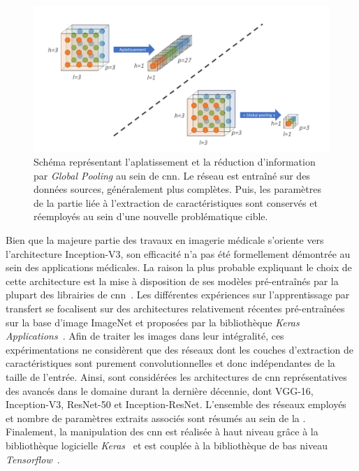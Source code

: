 \begin{figure}[H]
    \centering
    \includegraphics[width=\linewidth]{contents/chapter_4/resources/scheme_global_pooling.pdf}
    \caption{Schéma représentant l'aplatissement et la réduction d'information par \textit{Global Pooling} au sein de \gls{cnn}. Le réseau est entraîné sur des données sources, généralement plus complètes. Puis, les paramètres de la partie liée à l'extraction de caractéristiques sont conservés et réemployés au sein d'une nouvelle problématique cible.}
    \label{fig:scheme_global_pooling}
\end{figure}\par

Bien que la majeure partie des travaux en imagerie médicale s'oriente vers l'architecture Inception-V3, son efficacité n'a pas été formellement démontrée au sein des applications médicales. La raison la plus probable expliquant le choix de cette architecture est la mise à disposition de ses modèles pré-entraînés par la plupart des librairies de \gls{cnn}~\cite{Litjens2017}. Les différentes expériences sur l'apprentissage par transfert se focalisent sur des architectures relativement récentes pré-entraînées sur la base d'image ImageNet et proposées par la bibliothèque \textit{Keras Applications}~\cite{chollet2015a}. Afin de traiter les images dans leur intégralité, ces expérimentations ne considèrent que des réseaux dont les couches d'extraction de caractéristiques sont purement convolutionnelles et donc indépendantes de la taille de l'entrée. Ainsi, sont considérées les architectures de \gls{cnn} représentatives des avancés dans le domaine durant la dernière décennie, dont VGG-16, Inception-V3, ResNet-50 et Inception-ResNet. L'ensemble des réseaux employés et nombre de paramètres extraits associés sont résumés au sein de la . Finalement, la manipulation des \ac{cnn} est réalisée à haut niveau grâce à la bibliothèque logicielle \textit{Keras}~\cite{chollet2015} et est couplée à la bibliothèque de bas niveau \textit{Tensorflow}~\cite{tensorflow2015}.\par

